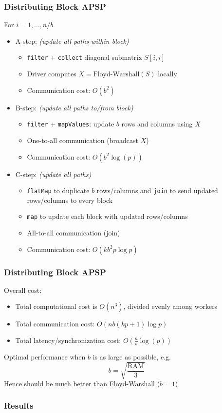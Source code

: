 \documentclass{beamer}
\begin{document}
\begin{frame}
\frametitle{Distributing Block APSP}
For $i = 1,\hdots, n/b$
\begin{itemize}
\item A-step: \emph{(update all paths within block)}
\begin{itemize}
\item {\tt filter} + {\tt collect} diagonal submatrix $S[i, i]$
\item Driver computes $X = \text{Floyd-Warshall}(S)$ locally
\item Communication cost: $O(b^2)$
\end{itemize} 
\item B-step: \emph{(update all paths to/from block)}
\begin{itemize}
\item {\tt filter} + {\tt mapValues}: update $b$ rows and columns using $X$
\item One-to-all communication (broadcast $X$)
\item Communication cost: $O(b^2 \log(p))$
\end{itemize}
\item C-step: \emph{(update all paths)}
\begin{itemize}
\item {\tt flatMap} to duplicate $b$ rows/columns and {\tt join} to send updated rows/columns to every block
\item {\tt map} to update each block with updated rows/columns
\item All-to-all communication (join)
\item Communication cost: $O(kb^2 p \log p)$
\end{itemize}
\end{itemize}
\end{frame}

\begin{frame}
\frametitle{Distributing Block APSP}
Overall cost:
\begin{itemize}
\item Total computational cost is $O(n^3)$, divided evenly among workers
\item Total communication cost: $O(nb(kp  + 1)\log p)$
\item Total latency/synchronization cost: $O(\frac{n}{b} \log(p))$
\end{itemize}
Optimal performance when $b$ is as large as possible, e.g.
\[
b = \sqrt{\frac{\text{RAM}}{3}}
\]
Hence should be much better than Floyd-Warshall ($b = 1$)
\end{frame}

\begin{frame}
\frametitle{Results}
\end{frame}
\end{document}

